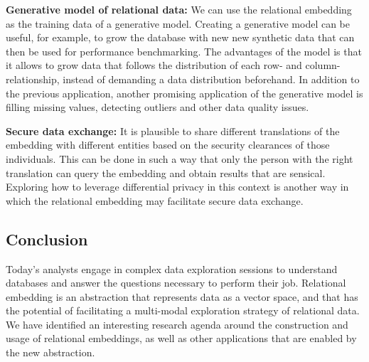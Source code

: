 \noindent\textbf{Generative model of relational data: }We can use the relational
embedding as the training data of a generative model. Creating a generative
model can be useful, for example, to grow the database with new new synthetic
data that can then be used for performance benchmarking. The advantages of the
model is that it allows to grow data that follows the distribution of each row-
and column-relationship, instead of demanding a data distribution beforehand. In
addition to the previous application, another promising application of the
generative model is filling missing values, detecting outliers and other data
quality issues.

\noindent\textbf{Secure data exchange: }It is plausible to share different
translations of the embedding with different entities based on the security
clearances of those individuals. This can be done in such a way that only the
person with the right translation can query the embedding and obtain results
that are sensical.  Exploring how to leverage differential privacy in this
context is another way in which the relational embedding may facilitate secure
data exchange.


\subsection*{Conclusion}

Today's analysts engage in complex data exploration sessions to understand
databases and answer the questions necessary to perform their job. Relational
embedding is an abstraction that represents data as a vector space, and that has
the potential of facilitating a multi-modal exploration strategy of relational
data. We have identified an interesting research agenda around the construction
and usage of relational embeddings, as well as other applications that are
enabled by the new abstraction.


